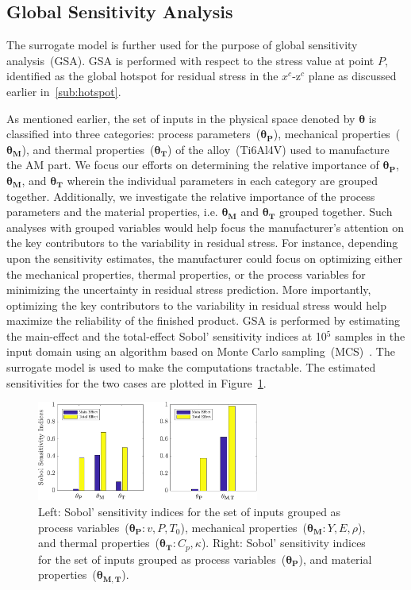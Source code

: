 \subsection{Global Sensitivity Analysis}
\label{sub:gsa}

The surrogate model is further used for the purpose of global sensitivity analysis~(GSA). %
GSA is performed with respect to the stress value at point $P$, identified as the global hotspot
for residual stress in the $x^c$-z$^c$ plane as discussed earlier in~\ref{sub:hotspot}. 

As mentioned earlier, the set of inputs in the physical space denoted by $\bm{\theta}$ is classified into three
categories: process parameters~($\bm{\theta_P}$), mechanical properties~($\bm{\theta_M}$), and
thermal properties~($\bm{\theta_T}$) of the alloy~(Ti6Al4V) used to manufacture the AM part. We focus
our efforts on determining the relative importance of $\bm{\theta_P}$, $\bm{\theta_M}$, and $\bm{\theta_T}$
wherein the individual parameters in each category are grouped together. Additionally, we investigate
the relative importance of the process
parameters and the material properties, i.e. $\bm{\theta_M}$ and $\bm{\theta_T}$ grouped together.
Such analyses with grouped variables would help focus the manufacturer's attention on the key
contributors to the variability in residual stress. For instance, depending upon the sensitivity estimates, the
manufacturer could focus on optimizing either the mechanical properties, thermal properties, or
the process variables for minimizing the uncertainty in residual stress prediction. 
More importantly, optimizing the key contributors to the variability in residual stress would help maximize the reliability
of the finished product. 
 GSA is performed by estimating the main-effect and the total-effect Sobol' sensitivity
indices at 10$^5$ samples in the input domain using an algorithm based on 
Monte Carlo sampling~(MCS)~\cite{Sobol:2001}. The 
surrogate model is used to make the computations tractable. The estimated sensitivities for the two cases
are plotted in Figure~\ref{fig:gsa}.
%
\begin{figure}[htbp]
\begin{center}
\includegraphics[width=0.65\textwidth]{./Figures/grouped_GSA}
\end{center}
\caption{Left: Sobol' sensitivity indices for the set of inputs grouped as process variables~($\bm{\theta_P}:v,P,T_0$), 
mechanical properties~($\bm{\theta_M}:Y,E,\rho$), and thermal properties~($\bm{\theta_T}:C_p,\kappa$).
Right: Sobol' sensitivity indices for the set of inputs grouped as process variables~($\bm{\theta_P}$), and material 
properties~($\bm{\theta_{M,T}}$).}
\label{fig:gsa}
\end{figure}
